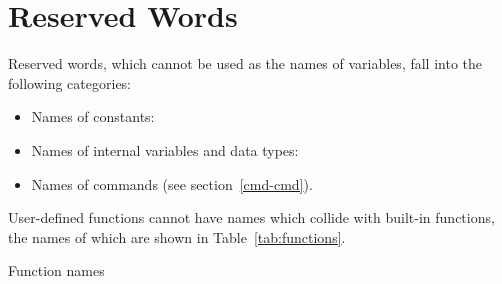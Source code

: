 \chapter{Reserved Words}
\label{reswords}

Reserved words, which cannot be used as the names of variables, fall
into the following categories:

\begin{itemize}
\item Names of constants:
  

\item Names of internal variables and data types:
  
  
\item Names of  commands (see section~\ref{cmd-cmd}).
\end{itemize}

User-defined functions cannot have names which collide with built-in
functions, the names of which are shown in Table~\ref{tab:functions}.

\begin{table}[htbp]
\caption{Function names}
\label{tab:functions}
\begin{center}

\end{center}
\end{table}

